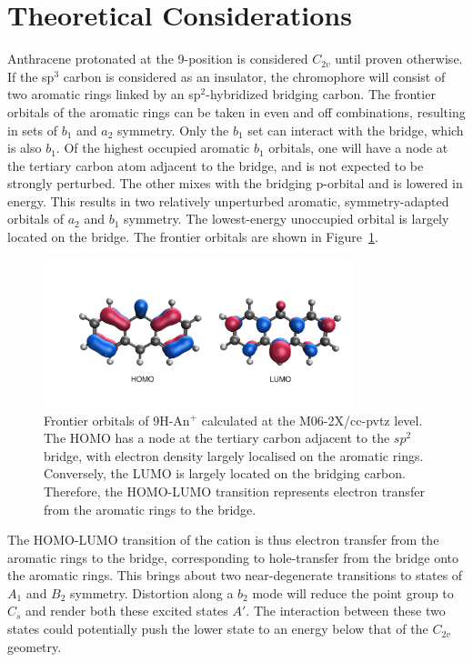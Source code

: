 \documentclass[journal=jpcafh,manuscript=article,layout=onecolumn, 12pt]{achemso}
\begin{document}
\section{Theoretical Considerations}
Anthracene protonated at the 9-position is considered $C_{2v}$ until proven otherwise. If the sp$^3$ carbon is considered as an insulator, the chromophore will consist of two aromatic rings linked by an sp$^2$-hybridized bridging carbon. The frontier orbitals of the aromatic rings can be taken in even and off combinations, resulting in sets of $b_1$ and $a_2$ symmetry. Only the $b_1$ set can interact with the bridge, which is also $b_1$. Of the highest occupied aromatic $b_1$ orbitals, one will have a node at the tertiary carbon atom adjacent to the bridge, and is not expected to be strongly perturbed. The other mixes with the bridging p-orbital and is lowered in energy. This results in two relatively unperturbed aromatic, symmetry-adapted orbitals of $a_2$ and $b_1$ symmetry. The lowest-energy unoccupied orbital is largely located on the bridge. The frontier orbitals are shown in Figure~\ref{Fig:1}.

\begin{figure} [h]
	\includegraphics[width=0.8\textwidth]{figures/Figure1}
	\caption{Frontier orbitals of 9H-An$^+$ calculated at the M06-2X/cc-pvtz level. The HOMO has a node at the tertiary carbon adjacent to the $sp^2$ bridge, with electron density largely localised on the aromatic rings. Conversely, the LUMO is largely located on the bridging carbon. Therefore, the HOMO-LUMO transition represents electron transfer from the aromatic rings to the bridge.}
	\label{Fig:1}
\end{figure}

The HOMO-LUMO transition of the cation is thus electron transfer from the aromatic rings to the bridge, corresponding to hole-transfer from the bridge onto the aromatic rings. This brings about two near-degenerate transitions to states of $A_1$ and $B_2$ symmetry. Distortion along a $b_2$ mode will reduce the point group to $C_s$ and render both these excited states $A'$. The interaction between these two states could potentially push the lower state to an energy below that of the $C_{2v}$ geometry.
\end{document}
